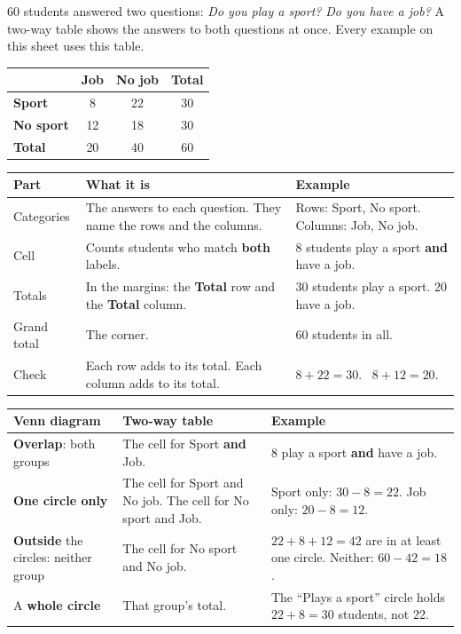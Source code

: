 \documentclass[11pt]{article}
\newcommand{\sumhead}[1]{\par\vspace{0.7em}{\large\bfseries #1}\par\vspace{0.3em}}
\renewcommand{\arraystretch}{1.25}
\newcommand{\sportjob}{{\renewcommand{\arraystretch}{1.4}%
\begin{tabular}{|l|c|c|c|}\hline
 & \textbf{Job} & \textbf{No job} & \textbf{Total} \\ \hline
\textbf{Sport} & 8 & 22 & 30 \\ \hline
\textbf{No sport} & 12 & 18 & 30 \\ \hline
\textbf{Total} & 20 & 40 & 60 \\ \hline
\end{tabular}}}
\newlength{\sumtw}
\newcommand{\sumtitle}[1]{\settowidth{\sumtw}{\Large\bfseries #1}%
  \ifdim\sumtw>4.3in \hfill Name \underline{\hspace{2in}}\par\vspace{0.5em}{\Large\bfseries #1}\par\vspace{0.6em}%
  \else {\Large\bfseries #1}\hfill Name \underline{\hspace{2in}}\par\vspace{0.6em}\fi}
\begin{document}
\sumtitle{Unit 3 Summary: Two-Way Tables}

\sumhead{Parts of a Two-Way Table}
\begin{minipage}[c]{0.56\linewidth}
60 students answered two questions: \textit{Do you play a sport?} \textit{Do you have a job?} A two-way table shows the answers to both questions at once. Every example on this sheet uses this table.
\end{minipage}\hfill
\begin{minipage}[c]{0.4\linewidth}\raggedleft
\sportjob
\end{minipage}

\vspace{0.6em}
\begin{tabular}{|L{1.45in}|L{2.5in}|L{2.52in}|}\hline
\textbf{Part} & \textbf{What it is} & \textbf{Example}\\ \hline
Categories & The answers to each question. They name the rows and the columns. & Rows: Sport, No sport. Columns: Job, No job.\\ \hline
Cell & Counts students who match \textbf{both} labels. & 8 students play a sport \textbf{and} have a job.\\ \hline
Totals & In the margins: the \textbf{Total} row and the \textbf{Total} column. & 30 students play a sport. 20 have a job.\\ \hline
Grand total & The corner. & 60 students in all.\\ \hline
Check & Each row adds to its total. Each column adds to its total. & $8 + 22 = 30$. \ $8 + 12 = 20$.\\ \hline
\end{tabular}

\sumhead{Venn Diagram and Two-Way Table}
\begin{tabular}{|L{1.45in}|L{2.5in}|L{2.52in}|}\hline
\textbf{Venn diagram} & \textbf{Two-way table} & \textbf{Example}\\ \hline
\textbf{Overlap}: both groups & The cell for Sport \textbf{and} Job. & 8 play a sport \textbf{and} have a job.\\ \hline
\textbf{One circle only} & The cell for Sport and No job. The cell for No sport and Job. & Sport only: $30 - 8 = 22$. Job only: $20 - 8 = 12$.\\ \hline
\textbf{Outside} the circles: neither group & The cell for No sport and No job. & $22 + 8 + 12 = 42$ are in at least one circle. Neither: $60 - 42 = 18$.\\ \hline
A \textbf{whole circle} & That group's total. & The ``Plays a sport'' circle holds $22 + 8 = 30$ students, not 22.\\ \hline
\end{tabular}
\end{document}
